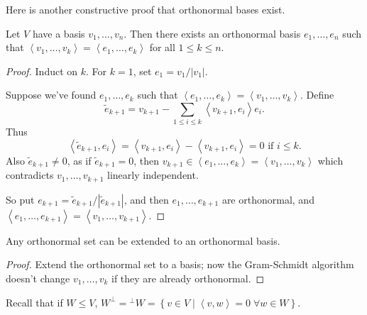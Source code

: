 Here is another constructive proof that orthonormal bases exist.

\begin{theorem}
	 Let $V$ have a basis $v_1,\ldots,v_n$. Then there exists an orthonormal basis $e_1,\ldots,e_n$ such that $\left\langle v_1,\ldots,v_k \right\rangle = \left\langle e_1,\ldots,e_k \right\rangle$ for all $1\leq k\leq n$. %
\end{theorem}

\begin{proof}
	Induct on $k$. For $k=1$, set $e_1=v_1/\left\vert v_1 \right\vert$. %
	
	Suppose we've found $e_1,\ldots,e_k$ such that $\left\langle e_1,\ldots,e_k \right\rangle = \left\langle v_1,\ldots,v_k \right\rangle$. Define %
	\begin{equation*}
		\tilde{e}_{k+1} = v_{k+1} - \sum_{1\leq i\leq k} \left\langle v_{k+1},e_i \right\rangle e_i. %
	\end{equation*}
	Thus
	\begin{equation*}
		\left\langle \tilde{e}_{k+1},e_i \right\rangle
		= \left\langle v_{k+1},e_i \right\rangle - \left\langle v_{k+1},e_i \right\rangle
		= 0 \text{ if } i\leq k.
	\end{equation*}
	Also $\tilde{e}_{k+1}\neq 0$, as if $\tilde{e}_{k+1}= 0$, then $v_{k+1}\in \left\langle e_1,\ldots,e_k \right\rangle = \left\langle v_1,\ldots,v_k \right\rangle$ which contradicts $v_1,\ldots,v_{k+1}$ linearly independent. %
	
	So put $e_{k+1} = \tilde{e}_{k+1}/\left\vert \tilde{e}_{k+1} \right\vert$, and then $e_1,\ldots,e_{k+1}$ are orthonormal, and $\left\langle e_1,\ldots,e_{k+1} \right\rangle = \left\langle v_1,\ldots,v_{k+1} \right\rangle$. %
\end{proof}

\vspace{3pt}
\begin{corollary}
	Any orthonormal set can be extended to an orthonormal basis. %
\end{corollary}

\begin{proof}
	Extend the orthonormal set to a basis; now the Gram-Schmidt algorithm doesn't change $v_1,\ldots,v_k$ if they are already orthonormal. %
\end{proof}

Recall that if $W\leq V$, $W^\perp = {}^\perp W = \left\{v\in V \mid \left\langle v,w \right\rangle=0 \;\forall w\in W \right\}$.

